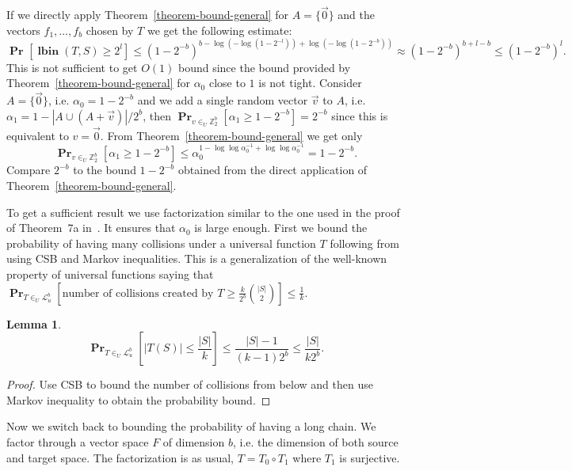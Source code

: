 \documentclass{article}
\newcommand{\lbin}[2]{\operatorname{\mathbf{lbin}}({#1}, {#2})}
\newcommand{\vecspace}[2]{\mathbb{Z}_{#1}^{#2}}
\newcommand{\binvecspace}[1]{\vecspace{2}{#1}}
\newcommand{\linearmaps}[2]{\mathcal{L}_{#1}^{#2}}
\newcommand{\probs}[2]{\operatorname{\mathbf{Pr}}_{{#1}}\left[{#2}\right]}
\newtheorem{lemma}{Lemma}
\begin{document}
If we directly apply Theorem~\ref{theorem-bound-general} for $A = \{\vec{0}\}$ and the vectors $f_1, \dots, f_b$ chosen by $T$ we get the following estimate:
\[
\probs{}{\lbin{T}{S} \geq 2^l} \leq (1 - 2^{-b})^{b - \log (-\log (1 - 2^{-l})) + \log (-\log (1 - 2^{-b}))} \approx (1 - 2^{-b})^{b + l - b} \leq (1-2^{-b})^{l}.
\]
This is not sufficient to get $O(1)$ bound since the bound provided by Theorem~\ref{theorem-bound-general} for $\alpha_0$ close to $1$ is not tight.
Consider $A = \{\vec{0}\}$, i.e. $\alpha_0 = 1 - 2^{-b}$ and we add a single random vector $\vec{v}$ to $A$, i.e. $\alpha_1 = 1 - |A \cup (A + \vec{v})|/2^b$, then $\probs{v\in_U\binvecspace{b}}{\alpha_1 \geq 1 - 2^{-b}} = 2^{-b}$ since this is equivalent to $v = \vec{0}$.
From Theorem~\ref{theorem-bound-general} we get only
\[
\probs{v\in_U\binvecspace{b}}{\alpha_1 \geq 1 - 2^{-b}} \leq \alpha_0^{1 - \log \log \alpha_0^{-1} + \log \log \alpha_0^{-1}} = 1 - 2^{-b}.
\]
Compare $2^{-b}$ to the bound $1-2^{-b}$ obtained from the direct application of Theorem~\ref{theorem-bound-general}.

To get a sufficient result we use factorization similar to the one used in the proof of Theorem~7a in~\cite{alonetal}. It ensures that $\alpha_0$ is large enough.
First we bound the probability of having many collisions under a universal function $T$ following from using CSB and Markov inequalities.
This is a generalization of the well-known property of universal functions saying that $\probs{T \in_U \linearmaps{u}{b}}{\mbox{number of collisions created by }T \geq \frac{k}{2^b} \binom{|S|}{2}} \leq \frac{1}{k}$.
\begin{lemma}
\label{lemma-collisions-general}
\[
\probs{T \in_U \linearmaps{u}{b}}{|T(S)| \leq \frac{|S|}{k}} \leq \frac{|S| - 1}{(k - 1)2^b} \leq \frac{|S|}{k2^b}.
\]
\end{lemma}
\begin{proof}
Use CSB to bound the number of collisions from below and then use Markov inequality to obtain the probability bound.
\end{proof}

Now we switch back to bounding the probability of having a long chain.
We factor through a vector space $F$ of dimension $b$, i.e. the dimension of both source and target space.
The factorization is as usual, $T = T_0 \circ T_1$ where $T_1$ is surjective.
\end{document}
